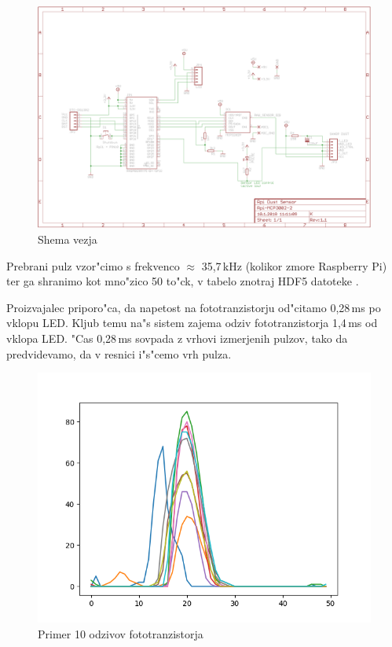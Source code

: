 \documentclass[11pt,a4paper]{article}
\begin{document}
\begin{figure}[H]
	\begin{center}
		\includegraphics[width=12cm]{scheme.png}
		\caption{Shema vezja}
	\end{center}
\end{figure}

Prebrani pulz vzor"cimo s frekvenco $ \approx $ 35,7\,kHz (kolikor zmore Raspberry Pi) ter ga shranimo kot mno"zico 50 to"ck, v tabelo znotraj HDF5 datoteke \cite{hdf5}.

Proizvajalec priporo"ca, da napetost na fototranzistorju od"citamo 0,28\,ms po vklopu LED. Kljub temu na"s sistem zajema odziv fototranzistorja 1,4\,ms od vklopa LED. "Cas 0,28\,ms sovpada z vrhovi izmerjenih pulzov, tako da predvidevamo, da v resnici i"s"cemo vrh pulza. 

\begin{figure}[H]
	\begin{center}
		\includegraphics[width=12cm]{pulses_old.png}
		\caption{Primer 10 odzivov fototranzistorja}
		\label{pulses-old}
	\end{center}
\end{figure}
\end{document}
